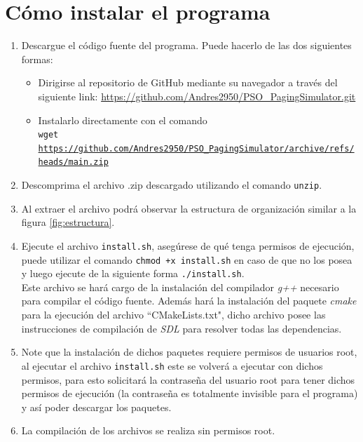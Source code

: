 \documentclass{report}
\begin{document}
\section{Cómo instalar el programa}
\begin{enumerate}
  \item Descargue el código fuente del programa. Puede hacerlo de las dos siguientes formas:
    \begin{itemize}
      \item Dirigirse al repositorio de GitHub mediante su navegador a través del siguiente link: \url{https://github.com/Andres2950/PSO\_PagingSimulator.git}
      \item Instalarlo directamente con el comando \\
    \texttt{wget \url{https://github.com/Andres2950/PSO\_PagingSimulator/archive/refs/heads/main.zip}}
    \end{itemize}
  \item Descomprima el archivo .zip descargado utilizando el comando \texttt{unzip}.
  \item Al extraer el archivo podrá observar la estructura de organización similar a la figura \ref{fig:estructura}.
\item Ejecute el archivo \texttt{install.sh}, asegúrese de qué tenga permisos de ejecución, puede utilizar el comando \texttt{chmod +x install.sh} en caso de que no los posea y luego ejecute de la siguiente forma \texttt{./install.sh}. \\
  Este archivo se hará cargo de la instalación del compilador \textit{g++} necesario para compilar el código fuente. Además hará la instalación del paquete \textit{cmake} para la ejecución del archivo ``CMakeLists.txt", dicho archivo posee las instrucciones de compilación de \textit{SDL} para resolver todas las dependencias. 
\item Note que la instalación de dichos paquetes requiere permisos de usuarios root, al ejecutar el archivo \texttt{install.sh} este se volverá a ejecutar con dichos permisos, para esto solicitará la contraseña del usuario root para tener dichos permisos de ejecución (la contraseña es totalmente invisible para el programa) y así poder descargar los paquetes.
\item La compilación de los archivos se realiza sin permisos root.

\end{enumerate}
\end{document}
